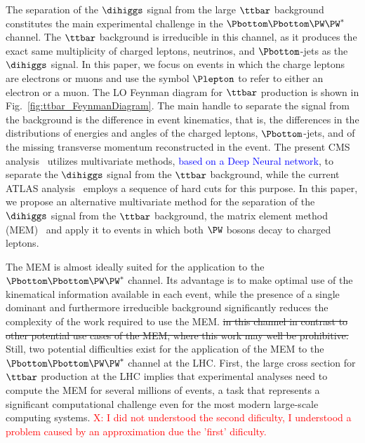 The separation of the $\dihiggs$ signal from the large $\ttbar$ background constitutes the main experimental challenge in the $\Pbottom\Pbottom\PW\PW^{*}$ channel.
The $\ttbar$ background is irreducible in this channel, as it produces the exact same multiplicity of charged leptons, neutrinos, and $\Pbottom$-jets as the $\dihiggs$ signal.
In this paper, we focus on events in which the charge leptons are electrons or muons and use the symbol $\Plepton$ to refer to either an electron or a muon.
The LO Feynman diagram for $\ttbar$ production is shown in Fig.~\ref{fig:ttbar_FeynmanDiagram}.
The main handle to separate the signal from the background is the difference in event kinematics,
that is, the differences in the distributions of energies and angles of the charged leptons, $\Pbottom$-jets, and of the missing transverse momentum reconstructed in the event.
The present CMS analysis~\cite{HIG-17-006} utilizes multivariate methods, \textcolor{blue}{ based on a Deep Neural network},
to separate the $\dihiggs$ signal from the $\ttbar$ background, while the current ATLAS analysis~\cite{Aaboud:2018zhh} employs a sequence of hard cuts for this purpose.
In this paper, we propose an alternative multivariate method for the separation of the $\dihiggs$ signal from the $\ttbar$ background,
the matrix element method (MEM)~\cite{Kondo:1988yd,Kondo:1991dw} and apply it to events in which both $\PW$ bosons decay to charged leptons.

The MEM is almost ideally suited for the application to the $\Pbottom\Pbottom\PW\PW^{*}$ channel.
Its advantage is to make optimal use of the kinematical information available in each event,
while the presence of a single dominant and furthermore irreducible background significantly reduces the complexity of the work required to use the MEM. \st{in this channel
in contrast to other potential use cases of the MEM, where this work may well be prohibitive.}
Still, two potential difficulties exist for the application of the MEM to the $\Pbottom\Pbottom\PW\PW^{*}$ channel at the LHC.
First, the large cross section for $\ttbar$ production at the LHC implies that experimental analyses need to compute the MEM for several millions of events,
a task that represents a significant computational challenge even for the most modern large-scale computing systems. \textcolor{red}{X: I did not understood the second dificulty, I understood a problem caused by an approximation due the 'first' dificulty.}

